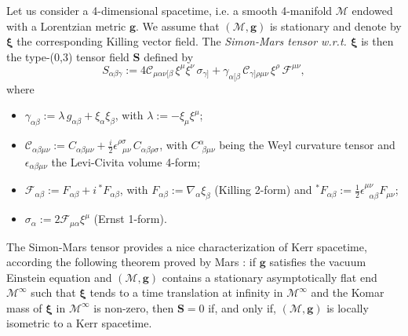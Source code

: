 \documentclass[a4paper]{jpconf}
\newcommand{\be}{\begin{equation}}
\newcommand{\ee}{\end{equation}}
\newcommand{\w}[1]{\bm{#1}}
\begin{document}
Let us consider a 4-dimensional spacetime, i.e. a smooth 
4-manifold $\mathcal{M}$ endowed with a Lorentzian metric $\w{g}$. 
We assume that $(\mathcal{M},\w{g})$ is stationary and denote by $\w{\xi}$ 
the corresponding Killing vector field. 
The \emph{Simon-Mars tensor w.r.t. $\w{\xi}$} is then
the type-(0,3) tensor field $\w{S}$ defined by \cite{Mars99}
\be \label{e:def_Simon-Mars}
S_{\alpha\beta\gamma} := 4 \mathcal{C}_{\mu\alpha\nu[\beta} \, \xi^\mu \xi^\nu \, \sigma_{\gamma]}
 + \gamma_{\alpha[\beta} \, \mathcal{C}_{\gamma]\rho\mu\nu} \, \xi^\rho \, \mathcal{F}^{\mu\nu} ,
\ee
where
\begin{itemize}
\item $\gamma_{\alpha\beta} := \lambda \, g_{\alpha\beta} + \xi_\alpha \xi_\beta$, 
with $\lambda := - \xi_\mu \xi^\mu$;
\item $\mathcal{C}_{\alpha\beta\mu\nu} := C_{\alpha\beta\mu\nu}
    + \frac{i}{2} \epsilon^{\rho\sigma}_{\ \ \, \mu\nu}\,  C_{\alpha\beta\rho\sigma} $,
with $C^\alpha_{\ \, \beta\mu\nu}$ being the Weyl curvature tensor and 
$\epsilon_{\alpha\beta\mu\nu}$ the Levi-Civita volume 4-form;
\item $\mathcal{F}_{\alpha\beta} := F_{\alpha\beta} + i\,  {}^*\!F_{\alpha\beta}$, 
with $F_{\alpha\beta} := \nabla_\alpha\xi_\beta$ (Killing 2-form) and 
${}^*\!F_{\alpha\beta} := \frac{1}{2} \epsilon^{\mu\nu}_{\ \ \, \alpha\beta} F_{\mu\nu}$;
\item $\sigma_\alpha := 2 \mathcal{F}_{\mu\alpha} \xi^\mu$ (Ernst 1-form).
\end{itemize}
The Simon-Mars tensor provides a nice characterization of Kerr spacetime,
according the following theorem proved by Mars \cite{Mars99}:
if $\w{g}$ satisfies the vacuum Einstein equation and $(\mathcal{M},\w{g})$
contains a stationary asymptotically flat end $\mathcal{M}^\infty$ such
that $\w{\xi}$ tends to a time translation at infinity in $\mathcal{M}^\infty$
and the Komar mass of $\w{\xi}$ in $\mathcal{M}^\infty$ is non-zero, then 
$\w{S} = 0$ if, and only if, $(\mathcal{M},\w{g})$ is locally isometric 
to a Kerr spacetime.
\end{document}
